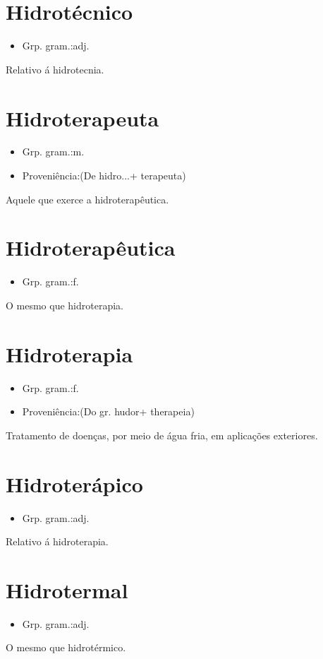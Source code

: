 \documentclass{article}
\begin{document}
\section{Hidrotécnico}
\begin{itemize}
\item {Grp. gram.:adj.}
\end{itemize}
Relativo á hidrotecnia.
\section{Hidroterapeuta}
\begin{itemize}
\item {Grp. gram.:m.}
\end{itemize}
\begin{itemize}
\item {Proveniência:(De \textunderscore hidro...\textunderscore  + \textunderscore terapeuta\textunderscore )}
\end{itemize}
Aquele que exerce a hidroterapêutica.
\section{Hidroterapêutica}
\begin{itemize}
\item {Grp. gram.:f.}
\end{itemize}
O mesmo que \textunderscore hidroterapia\textunderscore .
\section{Hidroterapia}
\begin{itemize}
\item {Grp. gram.:f.}
\end{itemize}
\begin{itemize}
\item {Proveniência:(Do gr. \textunderscore hudor\textunderscore  + \textunderscore therapeia\textunderscore )}
\end{itemize}
Tratamento de doenças, por meio de água fria, em aplicações exteriores.
\section{Hidroterápico}
\begin{itemize}
\item {Grp. gram.:adj.}
\end{itemize}
Relativo á hidroterapia.
\section{Hidrotermal}
\begin{itemize}
\item {Grp. gram.:adj.}
\end{itemize}
O mesmo que \textunderscore hidrotérmico\textunderscore .
\end{document}
